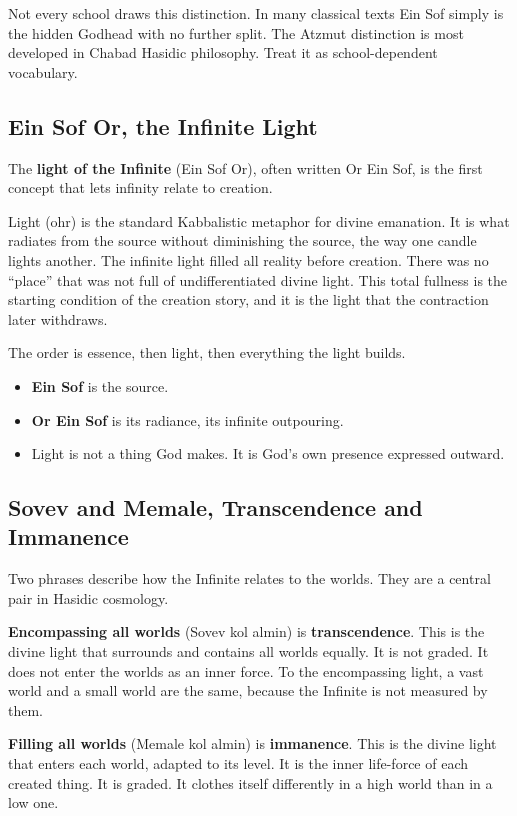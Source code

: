 Not every school draws this distinction. In many classical texts Ein Sof simply is
the hidden Godhead with no further split. The Atzmut distinction is most developed
in Chabad Hasidic philosophy. Treat it as school-dependent vocabulary.

\subsection{Ein Sof Or, the Infinite Light}

The \textbf{light of the Infinite} (Ein Sof Or), often written Or Ein Sof,
is the first concept that lets infinity relate to creation.

Light (ohr) is the standard Kabbalistic metaphor for divine emanation. It
is what radiates from the source without diminishing the source, the way one candle
lights another. The infinite light filled all reality before creation. There was no
\enquote{place} that was not full of undifferentiated divine light. This total
fullness is the starting condition of the creation story, and it is the light
that the contraction later withdraws.

The order is essence, then light, then everything the light builds.

\begin{itemize}
 \item \textbf{Ein Sof} is the source.
 \item \textbf{Or Ein Sof} is its radiance, its infinite outpouring.
 \item Light is not a thing God makes. It is God's own presence expressed outward.
\end{itemize}

\subsection{Sovev and Memale, Transcendence and Immanence}

Two phrases describe how the Infinite relates to the worlds. They are a central pair
in Hasidic cosmology.

\textbf{Encompassing all worlds} (Sovev kol almin) is
\textbf{transcendence}. This is the divine light that surrounds and contains all
worlds equally. It is not graded. It does not enter the worlds as an inner force. To
the encompassing light, a vast world and a small world are the same, because the
Infinite is not measured by them.

\textbf{Filling all worlds} (Memale kol almin) is \textbf{immanence}. This
is the divine light that enters each world, adapted to its level. It is the inner
life-force of each created thing. It is graded. It clothes itself differently in a
high world than in a low one.

